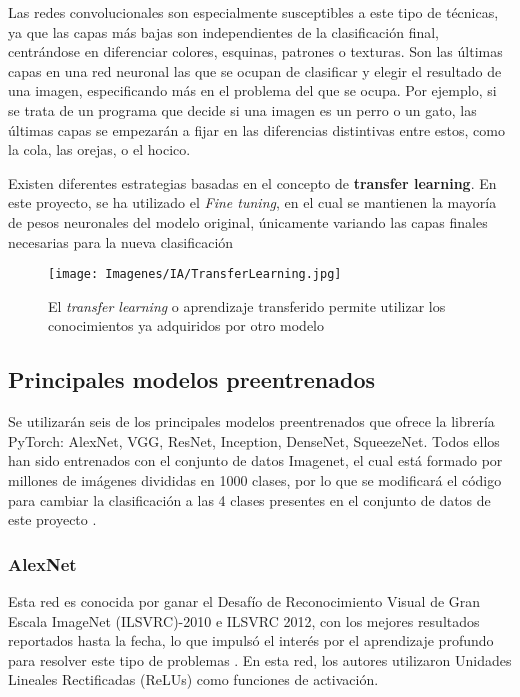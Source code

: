 \documentclass{report}
\begin{document}
Las redes convolucionales son especialmente susceptibles a este tipo de técnicas, ya que las capas más bajas son independientes de la clasificación final, centrándose en diferenciar colores, esquinas, patrones o texturas. Son las últimas capas en una red neuronal las que se ocupan de clasificar y elegir el resultado de una imagen, especificando más en el problema del que se ocupa. Por ejemplo, si se trata de un programa que decide si una imagen es un perro o un gato, las últimas capas se empezarán a fijar en las diferencias distintivas entre estos, como la cola, las orejas, o el hocico.

Existen diferentes estrategias basadas en el concepto de \textbf{transfer learning}. En este proyecto, se ha utilizado el \textit{Fine tuning}, en el cual se mantienen la mayoría de pesos neuronales del modelo original, únicamente variando las capas finales necesarias para la nueva clasificación \cite{EzequielFeatureExtraction}


\vspace{0.8cm}
\begin{figure}[H]
    \centering
    \texttt{[image: Imagenes/IA/TransferLearning.jpg]}
    \caption{ El \textit{transfer learning} o aprendizaje transferido permite utilizar los conocimientos ya adquiridos por otro modelo }
    \label{fig:TransferLearning}
\end{figure}
\vspace{0.8cm}



\subsection{Principales modelos preentrenados}

Se utilizarán seis de los principales modelos preentrenados que ofrece la librería PyTorch: AlexNet, VGG, ResNet, Inception, DenseNet, SqueezeNet. Todos ellos han sido entrenados con el conjunto de datos Imagenet, el cual está formado por millones de imágenes divididas en 1000 clases, por lo que se modificará el código para cambiar la clasificación a las 4 clases presentes en el conjunto de datos de este proyecto \cite{PyTorchFinTuningModels}.


\newpage
\subsubsection{AlexNet}

Esta red es conocida por ganar el Desafío de Reconocimiento Visual de Gran Escala ImageNet (ILSVRC)-2010 e ILSVRC 2012, con los mejores resultados reportados hasta la fecha, lo que impulsó el interés por el aprendizaje profundo para resolver este tipo de problemas \cite{AlexNetPaper}. En esta red, los autores utilizaron Unidades Lineales Rectificadas (ReLUs) como funciones de activación.
\end{document}
